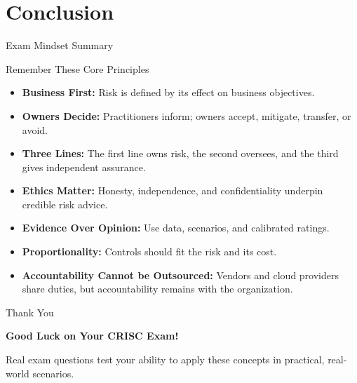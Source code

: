 \documentclass[aspectratio=169]{beamer}
\begin{document}
	\section{Conclusion}
	
	\begin{frame}{Exam Mindset Summary}
		\begin{block}{Remember These Core Principles}
			\begin{itemize}
				\item \textbf{Business First:} Risk is defined by its effect on business objectives.
				\item \textbf{Owners Decide:} Practitioners inform; owners accept, mitigate, transfer, or avoid.
				\item \textbf{Three Lines:} The first line owns risk, the second oversees, and the third gives independent assurance.
				\item \textbf{Ethics Matter:} Honesty, independence, and confidentiality underpin credible risk advice.
				\item \textbf{Evidence Over Opinion:} Use data, scenarios, and calibrated ratings.
				\item \textbf{Proportionality:} Controls should fit the risk and its cost.
				\item \textbf{Accountability Cannot be Outsourced:} Vendors and cloud providers share duties, but accountability remains with the organization.
			\end{itemize}
		\end{block}
	\end{frame}
	
	\begin{frame}{Thank You}
		\begin{center}
			{\Huge \textbf{Good Luck on Your CRISC Exam!}}
			
			\vspace{1cm}
			
			\normalsize
			Real exam questions test your ability to apply these concepts in practical, real-world scenarios.
		\end{center}
	\end{frame}
	
\end{document}
